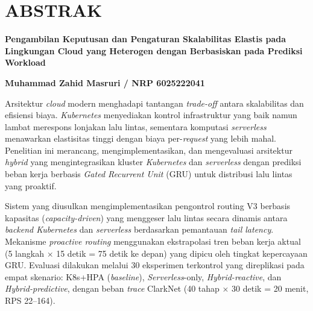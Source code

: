 
\clearpage


\section*{\large \centering \MakeUppercase 
    {Abstrak}
}

\begin{center}

    \justifying \normalsize

    \textbf{Pengambilan Keputusan dan Pengaturan Skalabilitas Elastis pada Lingkungan Cloud yang Heterogen dengan Berbasiskan pada Prediksi Workload}

    \vspace{0.5cm}

    \textbf{Muhammad Zahid Masruri / NRP 6025222041}

    \vspace{0.5cm}

    Arsitektur \emph{cloud} modern menghadapi tantangan \emph{trade-off} antara skalabilitas dan efisiensi biaya. \emph{Kubernetes} menyediakan kontrol infrastruktur yang baik namun lambat merespons lonjakan lalu lintas, sementara komputasi \emph{serverless} menawarkan elastisitas tinggi dengan biaya per-\emph{request} yang lebih mahal. Penelitian ini merancang, mengimplementasikan, dan mengevaluasi arsitektur \emph{hybrid} yang mengintegrasikan kluster \emph{Kubernetes} dan \emph{serverless} dengan prediksi beban kerja berbasis \emph{Gated Recurrent Unit} (GRU) untuk distribusi lalu lintas yang proaktif.

    Sistem yang diusulkan mengimplementasikan pengontrol routing V3 berbasis kapasitas (\emph{capacity-driven}) yang menggeser lalu lintas secara dinamis antara \emph{backend Kubernetes} dan \emph{serverless} berdasarkan pemantauan \emph{tail latency}. Mekanisme \emph{proactive routing} menggunakan ekstrapolasi tren beban kerja aktual (5 langkah $\times$ 15 detik = 75 detik ke depan) yang dipicu oleh tingkat kepercayaan GRU. Evaluasi dilakukan melalui 30 eksperimen terkontrol yang direplikasi pada empat skenario: K8s+HPA (\emph{baseline}), \emph{Serverless}-only, \emph{Hybrid-reactive}, dan \emph{Hybrid-predictive}, dengan beban \emph{trace} ClarkNet (40 tahap $\times$ 30 detik = 20 menit, RPS 22--164).


\end{center}
